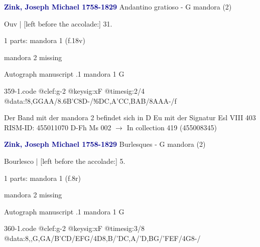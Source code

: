 \documentclass[twocolumn]{book}
\begin{document}
\newline \par \vspace{7pt} \textcolor{darkblue}{\textbf{Zink, Joseph Michael  1758-1829}}
\newline Andantino gratioso - G
\newline mandora (2)
\newline \begin{itshape}[f.18v, at left:] Ouv | [left before the accolade:] 31.\end{itshape} 
\newline \textcolor{darkblue}{}  1 parts: mandora 1  (f.18v)
\newline \begin{small} mandora 2 missing\end{small} 
\newline Autograph manuscript
.1  mandora 1  G  
\begin{filecontents*}{359-1.code}
@clef:g-2
@keysig:xF
@timesig:2/4
@data:!8,GGAA/{8.6B'C}8D-/!{6DC}{,A'C}{C,B}{AB}/8AAA-/f
\end{filecontents*}
\newline
%

\newline Der Band mit der mandora 2 befindet sich in D Eu mit der Signatur Esl VIII 403
\newline RISM-ID: 455011070
\newline D-Fh  Ms 002
\newline $\rightarrow$ In collection 419 (455008345)
      
\newline \par \vspace{7pt} \textcolor{darkblue}{\textbf{Zink, Joseph Michael  1758-1829}}
\newline Burlesques - G
\newline mandora (2)
\newline \begin{itshape}[f.8r, at left:] Bourlesco | [left before the accolade:] 5.\end{itshape} 
\newline \textcolor{darkblue}{}  1 parts: mandora 1  (f.8r)
\newline \begin{small} mandora 2 missing\end{small} 
\newline Autograph manuscript
.1  mandora 1  G  
\begin{filecontents*}{360-1.code}
@clef:g-2
@keysig:xF
@timesig:3/8
@data:8,,G,GA/B'CD/EFG/4D8,B/'DC,A/'D,BG/'FEF/4G8-/
\end{filecontents*}
\newline
%
\end{document}
